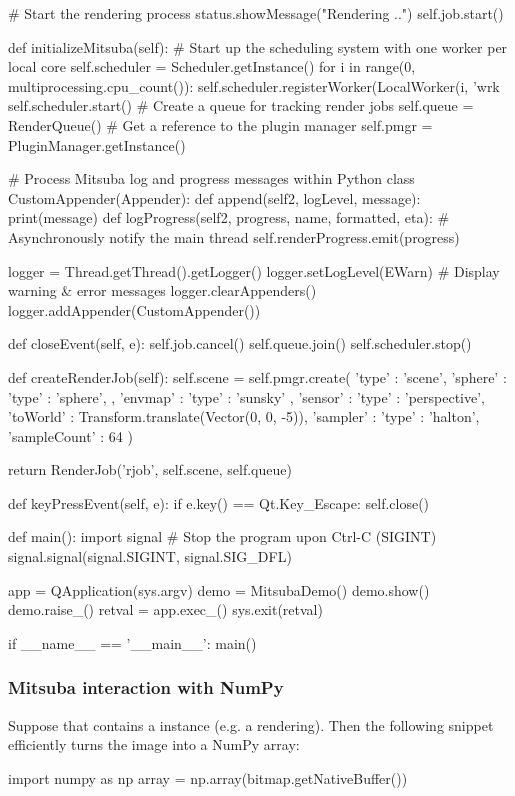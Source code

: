 \begin{python}
        # Start the rendering process
        status.showMessage("Rendering ..")
        self.job.start()

    def initializeMitsuba(self):
        # Start up the scheduling system with one worker per local core
        self.scheduler = Scheduler.getInstance()
        for i in range(0, multiprocessing.cpu_count()):
            self.scheduler.registerWorker(LocalWorker(i, 'wrk%
        self.scheduler.start()
        # Create a queue for tracking render jobs
        self.queue = RenderQueue()
        # Get a reference to the plugin manager
        self.pmgr = PluginManager.getInstance()

        # Process Mitsuba log and progress messages within Python
        class CustomAppender(Appender):
            def append(self2, logLevel, message):
                print(message)
            def logProgress(self2, progress, name, formatted, eta):
                # Asynchronously notify the main thread
                self.renderProgress.emit(progress)

        logger = Thread.getThread().getLogger()
        logger.setLogLevel(EWarn) # Display warning & error messages
        logger.clearAppenders()
        logger.addAppender(CustomAppender())

    def closeEvent(self, e):
        self.job.cancel()
        self.queue.join()
        self.scheduler.stop()

    def createRenderJob(self):
        self.scene = self.pmgr.create({
            'type' : 'scene',
            'sphere' : {
                'type' : 'sphere',
            },
            'envmap' : {
                'type' : 'sunsky'
            },
            'sensor' : {
                'type' : 'perspective',
                'toWorld' : Transform.translate(Vector(0, 0, -5)),
                'sampler' : {
                    'type' : 'halton',
                    'sampleCount' : 64
                }
            }
        })

        return RenderJob('rjob', self.scene, self.queue)

    def keyPressEvent(self, e):
        if e.key() == Qt.Key_Escape:
            self.close()

def main():
    import signal
    # Stop the program upon Ctrl-C (SIGINT)
    signal.signal(signal.SIGINT, signal.SIG_DFL)

    app = QApplication(sys.argv)
    demo = MitsubaDemo()
    demo.show()
    demo.raise_()
    retval = app.exec_()
    sys.exit(retval)

if __name__ == '__main__':
    main()
\end{python}


\subsubsection{Mitsuba interaction with NumPy}
Suppose that  contains a  instance (e.g. a rendering). Then the following snippet efficiently turns the image into a NumPy array:
\begin{python}
import numpy as np
array = np.array(bitmap.getNativeBuffer())
\end{python}
